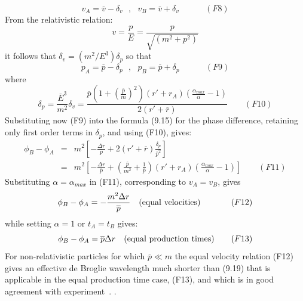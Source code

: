 \documentclass [12pt]{article}
\begin{document}
{    \[ v_A = \overline{v}-\delta_v~~~,~~~  v_B = \overline{v}+\delta_v~~~~~~~~~~~~~~(F8) \]
    From the relativistic relation:
   \[ v = \frac{p}{E} = \frac{p}{\sqrt{(m^2+p^2)}} \]
   it follows that $\delta_v = (m^2/E^3) \delta_p$ so that
     \[ p_A = \overline{p}-\delta_p~~~,~~~  p_B = \overline{p}+\delta_p~~~~~~~~~~~~~~(F9) \]
     where
    \[ \delta_p = \frac{\overline{E}^3}{m^2} \delta_v = \frac{ \overline{p}(1+(\frac{\overline{p}}{m})^2)(r'+r_A)
  (\frac{\alpha_{max}}{\alpha}-1)}{2(r'+\overline{r})} ~~~~~~~~~(F10) \]
   Substituting now (F9) into the formula (9.15) for the phase difference, retaining only 
   first order terms in $\delta_p$, and using (F10), gives:
     \begin{eqnarray} 
     \phi_B - \phi_A & = & m^2 \left[ -\frac{\Delta r}{\overline{p}}
     +2(r'+\overline{r})\frac{\delta_p}{\overline{p}^2}\right] \nonumber \\
 & = & m^2 \left[ -\frac{\Delta r}{\overline{p}}+\left(\frac{\overline{p}}{m^2}+\frac{1}{\overline{p}}\right)
      (r'+r_A)(\frac{\alpha_{max}}{\alpha}-1) \right]  \nonumber~~~~~~~~~(F11) 
   \end{eqnarray}
    Substituting $\alpha = \alpha_{max}$ in (F11), corresponding to $v_A = v_B$, gives
   \[  \phi_B - \phi_A  = -\frac{ m^2 \Delta r}{\overline{p}}~~~({\rm equal~velocities})~~~~~~~~~~~(F12) \]
  while setting $\alpha = 1$ or $ t_A =  t_B$ gives:
  \[  \phi_B - \phi_A  = \overline{p} \Delta r~~~({\rm equal~production~times})~~~~~~(F13) \]
    For non-relativistic particles for which $\overline{p} \ll m$ the equal velocity relation (F12)
    gives an effective de Broglie wavelength much shorter than (9.19) that is applicable in the
    equal production time case, (F13), and which is in good agreement with experiment~\cite{DG}.
. 

 

}
\end{document}
